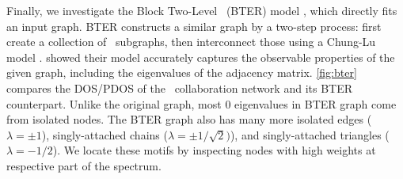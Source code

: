 Finally, we investigate the Block Two-Level \ErdosRenyi\ (BTER) model 
\cite{seshadhri2012community}, which directly fits an input graph. BTER
constructs a similar graph by a two-step process: first create a collection of
\ErdosRenyi\ subgraphs, then interconnect those using a Chung-Lu model  
\cite{chung2002connected}. \citeauthor{seshadhri2012community} showed their
model accurately captures the observable properties of the given graph,
including the eigenvalues of the adjacency matrix. \cref{fig:bter} compares the
DOS/PDOS of the \Erdos\ collaboration network and its BTER counterpart. Unlike
the original graph, most $0$ eigenvalues in BTER graph come from isolated nodes.
The BTER graph also has many more isolated edges ($\lambda=\pm1$),
singly-attached chains ($\lambda=\pm1/\sqrt{2})$), and singly-attached triangles
($\lambda=-1/2$). We locate these motifs by inspecting nodes with high weights
at respective part of the spectrum.

